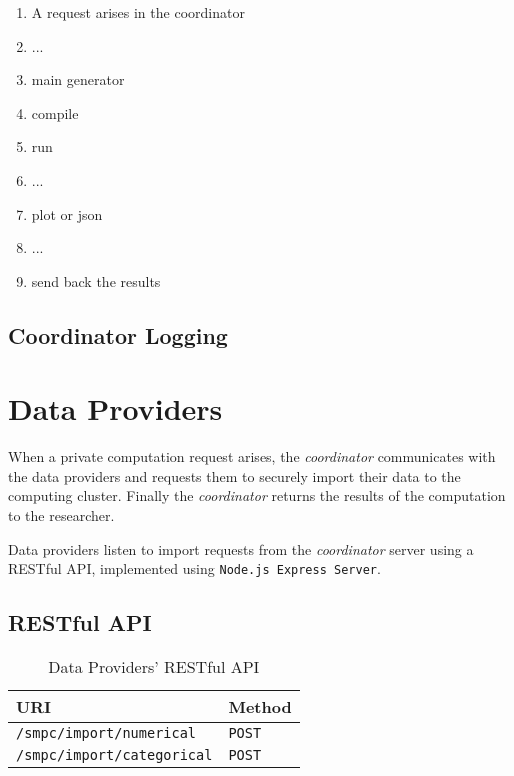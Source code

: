 
\begin{enumerate}
\item A request arises in the coordinator
\item ...
\item main generator
\item compile
\item run
\item ...
\item plot or json
\item ...
\item send back the results
\end{enumerate}


\subsection{Coordinator Logging}\label{ss:coordinator-logging}




\section{Data Providers}\label{s:impl-data-providers}
When a private computation request arises, the \textit{coordinator} communicates with the data providers and requests them to securely import their data to the computing cluster.
Finally the \textit{coordinator} returns the results of the computation to the researcher.

Data providers listen to import requests from the \textit{coordinator} server using a RESTful API, implemented using \texttt{Node.js Express Server}.



\subsection{RESTful API}\label{ss:data-providers-restful-api}

\begin{table}[H]
\centering
\caption{Data Providers' RESTful API}
\label{t:data-providers-api}
\begin{tabular}{@{}ll@{}}
\toprule
URI                                & Method        \\ \midrule
\texttt{/smpc/import/numerical}    & \texttt{POST} \\
\texttt{/smpc/import/categorical}  & \texttt{POST} \\ \bottomrule
\end{tabular}
\end{table}

